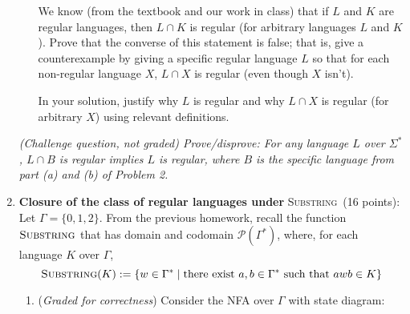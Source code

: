 \documentclass[12pt, oneside]{article}
\newcommand{\gradeCorrect}{({\it Graded for correctness}) }
\newcommand{\SUBSTRING}{\textsc{Substring}}
\begin{document}
\begin{enumerate}
\begin{enumerate}
    We know (from the textbook and our work in class) that if $L$ and $K$ are regular languages, 
    then $L \cap K$ is regular (for arbitrary languages $L$ and $K$). Prove that the converse of this statement is false; that is, 
    give a counterexample by giving a specific regular language $L$ so that
    for each non-regular language $X$, $L \cap X$ is regular (even though $X$ isn't).

    In your solution, justify why $L$ is regular 
    and why $L \cap X$ is regular (for arbitrary $X$) using relevant definitions.
\end{enumerate}


{\it (Challenge question, not graded) Prove/disprove: For 
any language $L$ over $\Sigma^*$, $L \cap B$ is regular implies $L$ is regular, where $B$ is the specific language from part (a) 
and (b) of Problem 2.}

\item {\bf Closure of the class of regular languages under} \SUBSTRING~(16 points): \\
Let $\Gamma = \{0,1,2\}$. From the previous homework, recall the function $\SUBSTRING$ that 
has domain and codomain
$\mathcal{P}(\Gamma^*)$, 
where, for each language $K$ over $\Gamma$,
$$\SUBSTRING(K) := \{ w \in \Gamma^* \mid \text{there exist } a,b \in \Gamma^* \text{ such that } awb \in K\}$$
\begin{enumerate}
\item \gradeCorrect Consider the NFA over $\Gamma$ with state diagram:
\begin{center}
\end{center}
\end{enumerate}
\end{enumerate}
\end{document}

